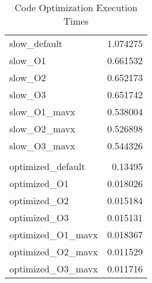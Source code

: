\begin{table}[htbp]
	\centering
	\caption{Code Optimization Execution Times}
	\begin{tabular}{lr}
		slow\_default       & 1.074275 \\
		slow\_O1            & 0.661532 \\
		slow\_O2            & 0.652173 \\
		slow\_O3            & 0.651742 \\
		slow\_O1\_mavx      & 0.538004 \\
		slow\_O2\_mavx      & 0.526898 \\
		slow\_O3\_mavx      & 0.544326 \\
		                    &          \\
		optimized\_default  & 0.13495  \\
		optimized\_O1       & 0.018026 \\
		optimized\_O2       & 0.015184 \\
		optimized\_O3       & 0.015131 \\
		optimized\_O1\_mavx & 0.018367 \\
		optimized\_O2\_mavx & 0.011529 \\
		optimized\_O3\_mavx & 0.011716 \\
	\end{tabular}%
	\label{tab:addlabel}%
\end{table}%